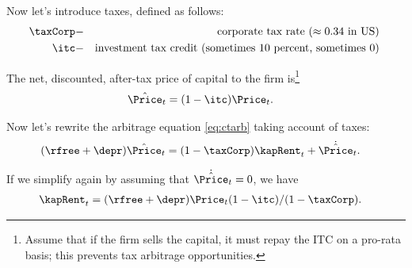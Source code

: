 Now let's introduce taxes, defined as follows:
\begin{equation*}\begin{gathered}\begin{aligned}
        \taxCorp & - & \text{corporate tax rate ($\approx 0.34$ in US) }
\\      \itc & - & \text{investment tax credit (sometimes 10 percent, sometimes 0) }
\end{aligned}\end{gathered}\end{equation*}

The net, discounted, after-tax price of capital to the firm is\footnote{Assume that if the firm sells the capital, it must repay the ITC on a pro-rata basis; this prevents tax arbitrage opportunities.}
\begin{equation}\begin{gathered}\begin{aligned}
        \hat{\Price}_{t} & =  (1-\itc) \Price_{t}.
\end{aligned}\end{gathered}\end{equation}

Now let's rewrite the arbitrage equation \eqref{eq:ctarb} taking account of taxes: 
\begin{equation}\begin{gathered}\begin{aligned}
        (\rfree+\depr) \hat{\Price}_{t} & =  (1-\taxCorp) \kapRent_{t}+\dot{\hat{\Price}}_{t}.
\end{aligned}\end{gathered}\end{equation}

If we simplify again by assuming that $\dot{\hat{\Price}}_{t}=0$, we have
\begin{equation}\begin{gathered}\begin{aligned}
        \kapRent_{t} & =  (\rfree+\depr)\Price_{t}(1-\itc)/(1-\taxCorp)
.
\end{aligned}\end{gathered}\end{equation}


